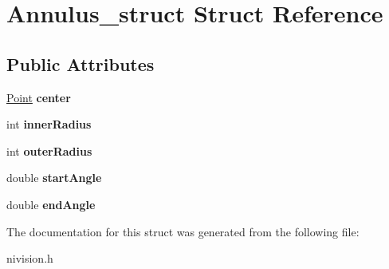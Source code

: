 \hypertarget{structAnnulus__struct}{\section{\-Annulus\-\_\-struct \-Struct \-Reference}
\label{structAnnulus__struct}
}
\subsection*{\-Public \-Attributes}
\begin{DoxyCompactItemize}
\item 
\hypertarget{structAnnulus__struct_ad4e0a22665f21e1437cfbf1bbd6004cc}{\hyperlink{structPoint__struct}{\-Point} {\bfseries center}}\label{structAnnulus__struct_ad4e0a22665f21e1437cfbf1bbd6004cc}

\item 
\hypertarget{structAnnulus__struct_aa068fa116e479be1dcc3db4da4a50235}{int {\bfseries inner\-Radius}}\label{structAnnulus__struct_aa068fa116e479be1dcc3db4da4a50235}

\item 
\hypertarget{structAnnulus__struct_ab30c506ce1fbf6fcb7550f92b945904c}{int {\bfseries outer\-Radius}}\label{structAnnulus__struct_ab30c506ce1fbf6fcb7550f92b945904c}

\item 
\hypertarget{structAnnulus__struct_ad5682c289e82034abd619bd01dfcd912}{double {\bfseries start\-Angle}}\label{structAnnulus__struct_ad5682c289e82034abd619bd01dfcd912}

\item 
\hypertarget{structAnnulus__struct_a57c921016268890aff96637b20530d8c}{double {\bfseries end\-Angle}}\label{structAnnulus__struct_a57c921016268890aff96637b20530d8c}

\end{DoxyCompactItemize}


\-The documentation for this struct was generated from the following file\-:\begin{DoxyCompactItemize}
\item 
nivision.\-h\end{DoxyCompactItemize}

